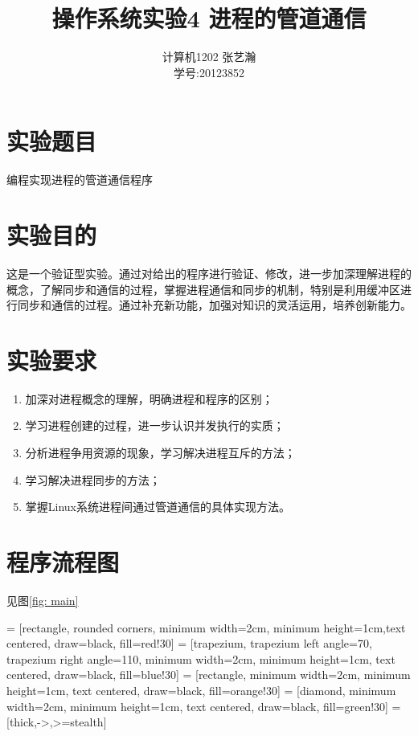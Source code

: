 \documentclass[11pt]{article}
\begin{document}
\title{操作系统实验4 \quad 进程的管道通信}
\author{计算机1202 \quad 张艺瀚\\学号:20123852}
\maketitle

\thispagestyle{fancy}
\normalsize 


\section{实验题目}
编程实现进程的管道通信程序

\section{实验目的}
这是一个验证型实验。通过对给出的程序进行验证、修改，进一步加深理解进程的概念，了解同步和通信的过程，掌握进程通信和同步的机制，特别是利用缓冲区进行同步和通信的过程。通过补充新功能，加强对知识的灵活运用，培养创新能力。

\section{实验要求}
\begin{enumerate}
\item 加深对进程概念的理解，明确进程和程序的区别；
\item 学习进程创建的过程，进一步认识并发执行的实质；
\item 分析进程争用资源的现象，学习解决进程互斥的方法；
\item 学习解决进程同步的方法；
\item 掌握Linux系统进程间通过管道通信的具体实现方法。
\end{enumerate}

\section{程序流程图}
见图\ref{fig: main}

 = [rectangle, rounded corners, minimum width=2cm, minimum height=1cm,text centered, draw=black, fill=red!30]
 = [trapezium, trapezium left angle=70, trapezium right angle=110, minimum width=2cm, minimum height=1cm, text centered, draw=black, fill=blue!30]
 = [rectangle, minimum width=2cm, minimum height=1cm, text centered, draw=black, fill=orange!30]
 = [diamond, minimum width=2cm, minimum height=1cm, text centered, draw=black, fill=green!30]
 = [thick,->,>=stealth]
\end{document}

